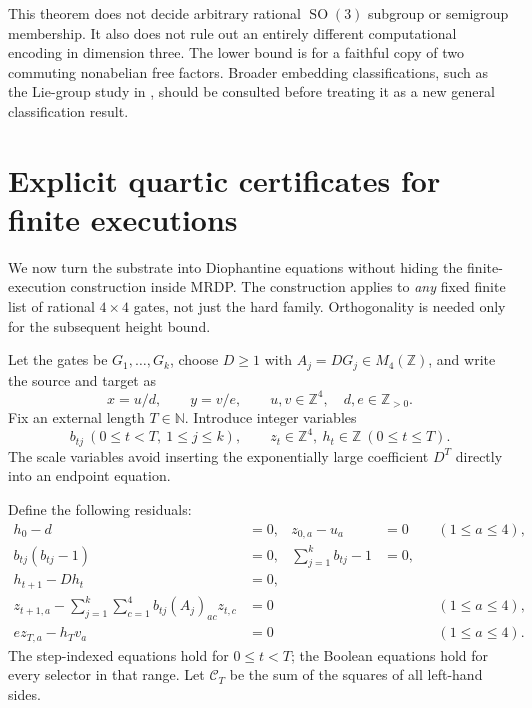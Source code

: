 \documentclass[11pt,letterpaper]{article}
\numberwithin{equation}{section}
\theoremstyle{definition}
\theoremstyle{remark}
\newcommand{\N}{\mathbb N}
\newcommand{\Z}{\mathbb Z}
\newcommand{\srcmark}[1]{\par\noindent{\small\itshape [source~#1]}\par}
\newcommand{\SO}{\operatorname{SO}}
\begin{document}
This theorem does not decide arbitrary rational $\SO(3)$ subgroup or
semigroup membership. It also does not rule out an entirely different
computational encoding in dimension three. The lower bound is for a
faithful copy of two commuting nonabelian free factors. Broader
embedding classifications, such as the Lie-group study in
\cite{b62s16-CampagnoloKammeyer}, should be consulted before treating it as
a new general classification result.

\section{Explicit quartic certificates for finite executions}
\label{pqc:rr:sec:certificates}
\srcmark{11}

We now turn the substrate into Diophantine equations without hiding the
finite-execution construction inside MRDP. The construction applies to
\emph{any} fixed finite list of rational $4\times4$ gates, not just the
hard family. Orthogonality is needed only for the subsequent height bound.

Let the gates be $G_1,\ldots,G_k$, choose $D\geq1$ with
$A_j=DG_j\in M_4(\Z)$, and write the source and target as
\[
 x=u/d,\qquad y=v/e,\qquad u,v\in\Z^4,\quad d,e\in\Z_{>0}.
\]
Fix an external length $T\in\N$. Introduce integer variables
\[
 b_{tj}\ (0\leq t<T,\ 1\leq j\leq k),\qquad
 z_t\in\Z^4,\ h_t\in\Z\ (0\leq t\leq T).
\]
The scale variables avoid inserting the exponentially large coefficient
$D^T$ directly into an endpoint equation.

Define the following residuals:
\begin{align}
 h_0-d&=0,&z_{0,a}-u_a&=0 &&(1\leq a\leq4),\label{pqc:rr:eq:certinit}\\
 b_{tj}(b_{tj}-1)&=0,&\sum_{j=1}^k b_{tj}-1&=0,
     &&\label{pqc:rr:eq:certselector}\\
 h_{t+1}-Dh_t&=0,
 &&&&\label{pqc:rr:eq:certscale}\\
 z_{t+1,a}-\sum_{j=1}^k\sum_{c=1}^4
       b_{tj}(A_j)_{ac}z_{t,c}&=0
 &&&&(1\leq a\leq4),\label{pqc:rr:eq:certstep}\\
 e z_{T,a}-h_T v_a&=0
 &&&&(1\leq a\leq4).\label{pqc:rr:eq:certend}
\end{align}
The step-indexed equations hold for $0\leq t<T$; the Boolean equations
hold for every selector in that range. Let $\mathcal C_T$ be the sum of
the squares of all left-hand sides.
\end{document}
